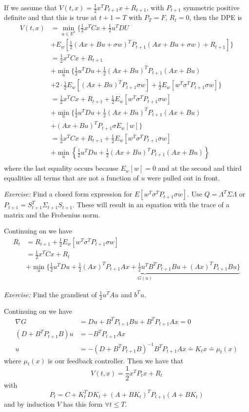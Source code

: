 \documentclass[lecture,12pt,]{pcms-l}
\theoremstyle{example}
\begin{document}
If we assume that $V(t,x) = \frac{1}{2}x^TP_{t+1}x + R_{t+1}$, with $P_{t+1}$ symmetric positive definite and that this is true at $t+1=T$ with $P_T=F$, $R_t=0$, then the DPE is
\begin{align*}
V(t,x) &= \min_{u\in\mathbb{R}^k}\{\frac{1}{2}x^TCx + \frac{1}{2}u^TDU  \\
&+ E_w[\frac{1}{2}(Ax+Bu+\sigma w)^TP_{t+1}(Ax+Bu+\sigma w) + R_{t+1}]\} \\
&= \frac{1}{2}x^TCx + R_{t+1} \\
&+ \min_u \{\frac{1}{2}u^TDu + \frac{1}{2}(Ax+Bu)^TP_{t+1}(Ax+Bu) \\
&+ 2\cdot\frac{1}{2}E_w[(Ax+Bu)^TP_{t+1}\sigma w] + \frac{1}{2}E_w[w^T\sigma^TP_{t+1}\sigma w]\} \\
&= \frac{1}{2}x^TCx + R_{t+1} + \frac{1}{2}E_w[w^T\sigma^TP_{t+1}\sigma w] \\
&+ \min_u \{ \frac{1}{2}u^TDu + \frac{1}{2}(Ax+Bu)^TP_{t+1}(Ax+Bu) \\
&+ (Ax+Bu)^TP_{t+1}\sigma E_w[w] \} \\
&= \frac{1}{2}x^TCx + R_{t+1} + \frac{1}{2}E_w[w^T\sigma^TP_{t+1}\sigma w] \\
&+ \min_u \left\lbrace \frac{1}{2}u^TDu + \frac{1}{2}(Ax+Bu)^TP_{t+1}(Ax+Bu) \right\rbrace \\
\end{align*}
where the last equality occurs because $E_w[w]=0$ and at the second and third equalities all terms that are not a function of $u$ were pulled out in front.

\textit{Exercise:} Find a closed form expression for $E[w^T\sigma^TP_{t+1}\sigma w]$. Use $Q=\Lambda^T\Sigma\Lambda$ or $P_{t+1} = S_{t+1}^T\Sigma_{t+1}S_{t+1}$. These will result in an equation with the trace of a matrix and the Frobenius norm.

Continuing on we have
\begin{align*}
R_t &= R_{t+1} + \frac{1}{2}E_w[w^T\sigma^TP_{t+1}\sigma w] \\
&= \frac{1}{2}x^TCx + R_t \\
&+ \min_u\{ \underbrace{\frac{1}{2}u^TDu + \frac{1}{2}(Ax)^TP_{t+1}Ax + \frac{1}{2}u^TB^TP_{t+1}Bu + (Ax)^TP_{t+1}Bu\}}_{G(u)}
\end{align*}

\textit{Exercise:} Find the grandient of $\frac{1}{2}u^TAu$ and $b^Tu$.

Continuing on we have
\begin{align*}
\nabla G &= Du + B^TP_{t+1}Bu + B^TP_{t+1}Ax = 0 \\
(D+B^TP_{t+1}B)u &= -B^TP_{t+1}Ax \\
u &= -(D+B^TP_{t+1}B)^{-1}B^TP_{t+1}Ax \doteq K_tx \doteq \mu_t(x)
\end{align*}
where $\mu_t(x)$ is our feedback controller. Then we have that
$$V(t,x) = \frac{1}{2}x^TP_tx + R_t$$
with
$$P_t = C+ K_t^TDK_t + (A+BK_t)^TP_{t+1}(A+BK_t)$$
and by induction $V$ has this form $\forall t\leq T$.
\end{document}

